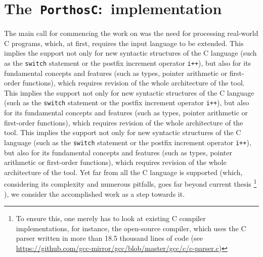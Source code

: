 \chapter{The~\texttt{PorthosC}:~implementation}
\label{ch:impl}

The main call for commencing the work on \porthos[2] was the need for processing real-world C programs, which, at first, requires the input language to be extended.
This implies the support not only for new syntactic structures of the C language (such as the \texttt{switch} statement or the postfix increment operator \texttt{i++}), but also for its fundamental concepts and features (such as types, pointer arithmetic or first-order functions), which requires revision of the whole architecture of the tool.
This implies the support not only for new syntactic structures of the C language (such as the \texttt{switch} statement or the postfix increment operator \texttt{i++}), but also for its fundamental concepts and features (such as types, pointer arithmetic or first-order functions), which requires revision of the whole architecture of the tool.
This implies the support not only for new syntactic structures of the C language (such as the \texttt{switch} statement or the postfix increment operator \texttt{i++}), but also for its fundamental concepts and features (such as types, pointer arithmetic or first-order functions), which requires revision of the whole architecture of the tool.
Yet far from all the C language is supported (which, considering its complexity and numerous pitfalls, goes far beyond current thesis%
%
\footnote{To ensure this, one merely has to look at existing C compiler implementations, for instance, the open-source  compiler, which uses the C parser written in more than 18.5 thousand lines of code (see \url{https://github.com/gcc-mirror/gcc/blob/master/gcc/c/c-parser.c})}%
%
), we consider the accomplished work as a step towards it.



